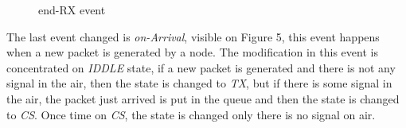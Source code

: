 \documentclass[conference]{IEEEtran}
\begin{document}
\begin{figure}[H]
	\centering	
	\caption{end-RX event}%
\end{figure}

The last event changed is \textit{on-Arrival}, visible on Figure 5, this event happens when a new packet is generated by a node. The modification in this event is concentrated on \textit{IDDLE} state,  if a new packet is generated and  there is not any signal in the air, then the state is changed to \textit{TX}, but if there is some signal in the air, the packet just arrived is put in the queue and then the state is changed to \textit{CS}. Once time on \textit{CS}, the state is changed only there is no signal on air.
\end{document}
